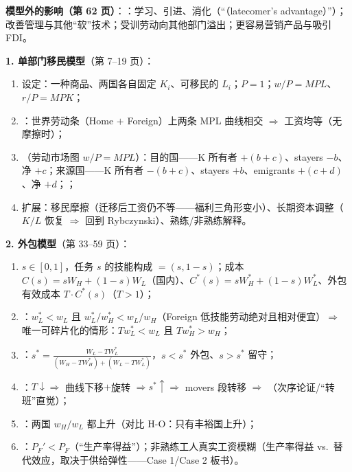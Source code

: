 \textbf{模型外的影响（第 62 页）}：：学习、引进、消化（``（latecomer's advantage）''）；改善管理与其他``软''技术；受训劳动向其他部门溢出；更容易营销产品与吸引 FDI。


\begin{mapbox}[移民与外包的方法地图]
\textbf{1. 单部门移民模型}（第 7--19 页）：
\begin{enumerate}
  \item 设定：一种商品、两国各自固定 $K_i$、可移民的 $L_i$；$P = 1$；$w/P = MPL$、$r/P = MPK$；
  \item {}：世界劳动条（Home $+$ Foreign）上两条 MPL 曲线相交 $\Rightarrow$ 工资均等（无摩擦时）；
  \item {}（劳动市场图 $w/P = MPL$）：目的国——K 所有者 $+(b+c)$、stayers $-b$、净 $+c$；来源国——K 所有者 $-(b+c)$、stayers $+b$、emigrants $+(c+d)$、净 $+d$；；
  \item 扩展：移民摩擦（迁移后工资仍不等——福利三角形变小）、长期资本调整（$K/L$ 恢复 $\Rightarrow$ 回到 Rybczynski）、熟练/非熟练解释。
\end{enumerate}
\textbf{2. 外包模型}（第 33--59 页）：
\begin{enumerate}
  \item {} $s \in [0,1]$，任务 $s$ 的技能构成 $= (s, 1-s)$；成本 $C(s) = sW_H + (1-s)W_L$（国内）、$C^*(s) = sW_H^* + (1-s)W_L^*$、外包有效成本 $T \cdot C^*(s)$（$T > 1$）；
  \item {}：$w_L^* < w_L$ 且 $w_L^*/w_H^* < w_L/w_H$（Foreign 低技能劳动绝对且相对便宜）$\Rightarrow$ 唯一可碎片化的情形：$T w_L^* < w_L$ 且 $T w_H^* > w_H$；
  \item {}：$s^* = \frac{W_L - TW_L^*}{(W_H - TW_H^*) + (W_L - TW_L^*)}$，$s < s^*$ 外包、$s > s^*$ 留守；
  \item {}：$T \downarrow \Rightarrow$ 曲线下移$+$旋转 $\Rightarrow s^* \uparrow \Rightarrow$ movers 段转移 $\Rightarrow$ （次序论证/``转班''直觉）；
  \item {}：两国 $w_H/w_L$ 都上升（对比 H-O：只有丰裕国上升）；
  \item {}：$P_F' < P_F$（``生产率得益''）；非熟练工人真实工资模糊（生产率得益 vs.\ 替代效应，取决于供给弹性——Case 1/Case 2 板书）。
\end{enumerate}
\end{mapbox}

